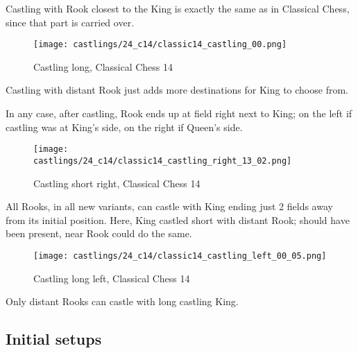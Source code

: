 Castling with Rook closest to the King is exactly the same as in Classical Chess,
since that part is carried over.

\noindent
\begin{figure}[!h]
\texttt{[image: castlings/24\_c14/classic14\_castling\_00.png]}
\vspace*{-1.4\baselineskip}
\caption{Castling long, Classical Chess 14}
\label{fig:classic14_castling_00}
\end{figure}

Castling with distant Rook just adds more destinations for King to choose from.

\vfill{}

\clearpage %

In any case, after castling, Rook ends up at field right next to King; on the left
if castling was at King's side, on the right if Queen's side.

\noindent
\begin{figure}[!h]
\texttt{[image: castlings/24\_c14/classic14\_castling\_right\_13\_02.png]}
\vspace*{-1.4\baselineskip}
\caption{Castling short right, Classical Chess 14}
\label{fig:classic14_castling_right_13_02}
\end{figure}

All Rooks, in all new variants, can castle with King ending just 2 fields away from
its initial position. Here, King castled short with distant Rook; should have been
present, near Rook could do the same.

\noindent
\begin{figure}[!h]
\texttt{[image: castlings/24\_c14/classic14\_castling\_left\_00\_05.png]}
\vspace*{-1.4\baselineskip}
\caption{Castling long left, Classical Chess 14}
\label{fig:classic14_castling_left_00_05}
\end{figure}

Only distant Rooks can castle with long castling King.

\clearpage %

\subsection*{Initial setups}
\label{sec:Simple variants/Classical Chess variants/Initial setups}

